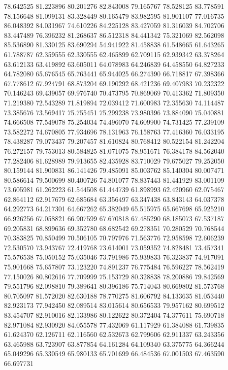 78.642525
81.223896
80.201276
82.843008
79.165767
78.528125
83.778591
78.156648
81.099131
83.328449
80.165479
83.982595
81.901107
77.016735
86.048392
84.031967
74.610226
84.225128
83.427059
81.316039
84.702706
83.447489
76.396232
81.268637
86.512318
84.441342
75.321069
82.562098
85.536890
81.330125
83.690294
54.941922
81.458838
61.548665
61.643265
61.788787
62.359555
62.330555
62.465899
62.709115
62.939342
63.378264
63.612133
63.419892
63.605011
64.078983
64.246839
64.458550
64.827233
64.782080
65.676545
65.763441
65.944025
66.274390
66.718817
67.398366
67.778612
67.924791
68.873204
69.190292
68.421236
69.407983
70.232322
70.146243
69.439057
69.976740
70.473795
70.869069
70.413362
71.809350
71.219380
72.543289
71.819894
72.039412
71.600983
72.355630
74.114487
73.385676
73.569417
75.755451
75.299238
73.980396
73.884090
75.040881
74.666508
77.549078
75.254034
74.496070
74.609900
74.731425
77.239109
73.582272
74.670805
77.934696
78.131963
76.158763
77.416360
76.033195
78.438287
79.073437
79.207457
81.610824
80.768412
80.522154
81.242204
76.272157
79.753013
80.584825
81.071075
78.951671
76.384178
84.562040
77.282406
81.628989
79.913655
82.435928
83.710029
79.675027
79.252050
80.159144
81.900831
86.141426
79.485091
85.003762
85.140304
80.007471
80.586614
79.500699
80.400726
74.801077
78.837443
81.441929
83.001109
73.605981
61.262223
61.544508
61.444739
61.898993
62.420960
62.075467
62.864112
62.917679
62.685684
63.356497
63.347438
63.843143
64.037378
64.292773
64.217301
64.667262
65.382049
65.515975
65.667698
65.925210
66.926256
67.058821
66.907599
67.670818
67.485290
68.185073
67.537187
69.205831
68.899636
69.352780
68.682542
69.278351
70.280529
70.768544
70.383825
70.850499
70.506105
70.797976
71.563776
72.958598
72.606239
72.530570
73.943767
72.419768
73.614001
73.059352
74.828481
73.457341
75.576538
75.050152
75.035046
73.791986
75.939833
76.323837
74.917091
75.901668
75.657807
73.123220
74.891237
76.775484
76.596227
78.562419
77.150026
80.802616
77.709999
75.153729
80.328838
78.200886
79.842569
79.551796
82.098810
79.389641
80.396186
75.714043
80.669802
81.573768
80.705097
81.572020
82.630188
78.770275
81.606792
84.133635
81.053440
82.923173
77.942450
82.089514
83.015614
80.656533
79.957162
80.699512
83.454707
82.910016
82.133986
80.122622
80.372404
74.377611
75.690718
82.971084
82.930920
84.055578
77.432069
61.117929
61.384088
61.739835
61.624370
62.126711
62.116560
62.532673
62.799606
62.911337
63.243356
63.465988
63.723907
63.877854
64.161284
64.109340
63.375775
64.366244
65.049296
65.330549
65.980133
65.701699
66.484536
67.001503
67.463590
66.697731
